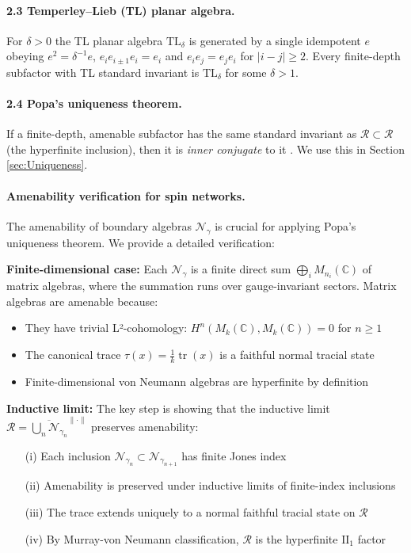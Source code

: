 \documentclass[11pt]{article}
\begin{document}
\paragraph{2.3  Temperley–Lieb (TL) planar algebra.}
For $\delta>0$ the TL planar algebra $\mathrm{TL}_\delta$ is generated by
a single idempotent $e$ obeying
$e^{2}=\delta^{-1}e$,
$e_ie_{i\pm1}e_i=e_i$ and $e_ie_j=e_je_i$ for $|i-j|\ge2$.
Every finite-depth subfactor with TL standard invariant is
$\mathrm{TL}_\delta$ for some $\delta>1$.

\paragraph{2.4  Popa’s uniqueness theorem.}
If a finite-depth, amenable subfactor has the same standard invariant as
$\mathcal R\subset\mathcal R$ (the hyperfinite inclusion), then it is
\emph{inner conjugate} to it \cite[Thm.~4.5]{PopaCBMS}.  We use this in
Section \ref{sec:Uniqueness}.

\paragraph{Amenability verification for spin networks.}
The amenability of boundary algebras $\mathcal{N}_\gamma$ is crucial for applying 
Popa's uniqueness theorem. We provide a detailed verification:

\textbf{Finite-dimensional case:} Each $\mathcal{N}_\gamma$ is a finite direct sum
$\bigoplus_i M_{n_i}(\mathbb{C})$ of matrix algebras, where the summation runs over
gauge-invariant sectors. Matrix algebras are amenable because:
\begin{itemize}
\item They have trivial L²-cohomology: $H^n(M_k(\mathbb{C}), M_k(\mathbb{C})) = 0$ for $n \geq 1$
\item The canonical trace $\tau(x) = \frac{1}{k}\operatorname{tr}(x)$ is a faithful normal tracial state
\item Finite-dimensional von Neumann algebras are hyperfinite by definition
\end{itemize}

\textbf{Inductive limit:} The key step is showing that the inductive limit
$\mathcal{R} = \overline{\bigcup_n \mathcal{N}_{\gamma_n}}^{\|\cdot\|}$ preserves amenability:
\begin{itemize}
\item[(i)] Each inclusion $\mathcal{N}_{\gamma_n} \subset \mathcal{N}_{\gamma_{n+1}}$ has finite Jones index
\item[(ii)] Amenability is preserved under inductive limits of finite-index inclusions \cite[Thm.~6.1.4]{PitPolBook}
\item[(iii)] The trace extends uniquely to a normal faithful tracial state on $\mathcal{R}$
\item[(iv)] By Murray-von Neumann classification, $\mathcal{R}$ is the hyperfinite $\text{II}_1$ factor
\end{itemize}
\end{document}
